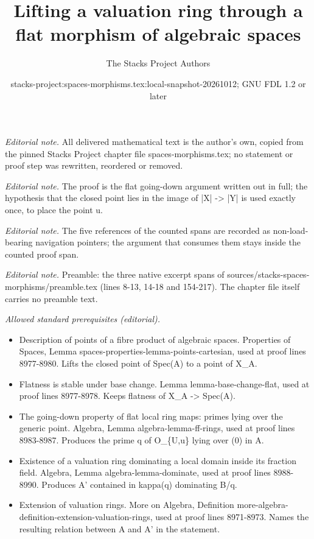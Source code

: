 \documentclass[10pt,a4paper]{amsart}
\title{Lifting a valuation ring through a flat morphism of algebraic spaces}
\author{The Stacks Project Authors}
\date{stacks-project:spaces-morphisms.tex:local-snapshot-20261012; GNU FDL 1.2 or later}
\theoremstyle{plain}
\theoremstyle{definition}
\theoremstyle{remark}
\numberwithin{equation}{subsection}
\begin{document}
\maketitle
\setcounter{subsection}{1}
\noindent\textit{Editorial note.} All delivered mathematical text is the author's own, copied from the pinned Stacks Project chapter file spaces-morphisms.tex; no statement or proof step was rewritten, reordered or removed.\par\medskip
\noindent\textit{Editorial note.} The proof is the flat going-down argument written out in full; the hypothesis that the closed point lies in the image of |X| -> |Y| is used exactly once, to place the point u.\par\medskip
\noindent\textit{Editorial note.} The five references of the counted spans are recorded as non-load-bearing navigation pointers; the argument that consumes them stays inside the counted proof span.\par\medskip
\noindent\textit{Editorial note.} Preamble: the three native excerpt spans of sources/stacks-spaces-morphisms/preamble.tex (lines 8-13, 14-18 and 154-217). The chapter file itself carries no preamble text.\par\medskip
\noindent\textit{Allowed standard prerequisites (editorial).}\begin{itemize}
\item Description of points of a fibre product of algebraic spaces. Properties of Spaces, Lemma spaces-properties-lemma-points-cartesian, used at proof lines 8977-8980. Lifts the closed point of Spec(A) to a point of X\_A.
\item Flatness is stable under base change. Lemma lemma-base-change-flat, used at proof lines 8977-8978. Keeps flatness of X\_A -> Spec(A).
\item The going-down property of flat local ring maps: primes lying over the generic point. Algebra, Lemma algebra-lemma-ff-rings, used at proof lines 8983-8987. Produces the prime q of O\_\{U,u\} lying over (0) in A.
\item Existence of a valuation ring dominating a local domain inside its fraction field. Algebra, Lemma algebra-lemma-dominate, used at proof lines 8988-8990. Produces A' contained in kappa(q) dominating B/q.
\item Extension of valuation rings. More on Algebra, Definition more-algebra-definition-extension-valuation-rings, used at proof lines 8971-8973. Names the resulting relation between A and A' in the statement.
\end{itemize}\medskip
\end{document}
